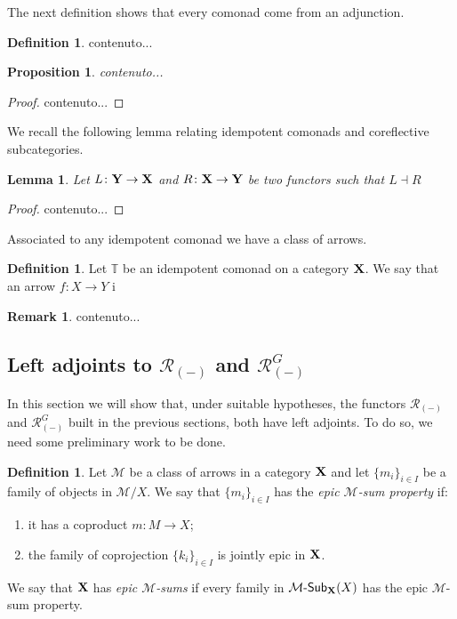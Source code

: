 \documentclass[a4paper]{article}
\newcommand{\sub}[3]{{\mathcal{#1}}\textrm{-}\mathsf{Sub}_{\textbf {\textup{#2}}}(#3)}
\def\X{\textbf {\textup{X}}}
\def\Y{\textbf {\textup{Y}}}
\newcommand{\m}[1]{\mathbb{#1}}
\newtheorem{proposition}[theorem]{Proposition}
\newtheorem{lemma}[theorem]{Lemma}
\theoremstyle{definition}
\newtheorem{definition}[theorem]{Definition}
\newtheorem{remark}[theorem]{Remark}
\begin{document}
The next definition shows that every comonad come from an adjunction.

\begin{definition}
	contenuto...
\end{definition}

\begin{proposition}
	contenuto...
\end{proposition}
\begin{proof}
	contenuto...
\end{proof}


We recall the following lemma relating idempotent comonads and coreflective subcategories.

\begin{lemma}\label{lem:comsub}
	Let $L\colon \Y\to \X$ and $R\colon \X \to \Y$ be two functors such that $L\dashv R$
\end{lemma}
\begin{proof}
	contenuto...
\end{proof}

Associated to any idempotent comonad we have a class of arrows.

\begin{definition}
	Let $\m{T}$ be an idempotent comonad on a category $\X$. We say that an arrow $f:X\to Y$ i
\end{definition}
\begin{remark}
	contenuto...
\end{remark}
\fi 


\subsection{Left adjoints to $\mathcal{R}_{(-)}$ and $\mathcal{R}^G_{(-)}$}

In this section we will show that, under suitable hypotheses, the functors $\mathcal{R}_{(-)}$ and $\mathcal{R}^G_{(-)}$ built in the previous sections, both have left adjoints. To do so, we need some preliminary work to be done.


\begin{definition}
	Let $\mathcal{M}$ be a class of arrows in a category $\X$ and let $\{m_i\}_{i\in I}$ be a family of objects in $\mathcal{M}/X$. We say that $\{m_i\}_{i\in I}$ has the \emph{epic $\mathcal{M}$-sum property} if:
	\begin{enumerate}
		\item it has a  coproduct $m\colon M\to X$;
		\item the family  of coprojection $\{k_i\}_{i\in I}$ is jointly epic in $\X$.
	\end{enumerate}
	
	We say that $\X$ has \emph{epic $\mathcal{M}$-sums} if every family in $\sub{M}{X}{X}$ has the epic $\mathcal{M}$-sum property.
\end{definition}
\end{document}
